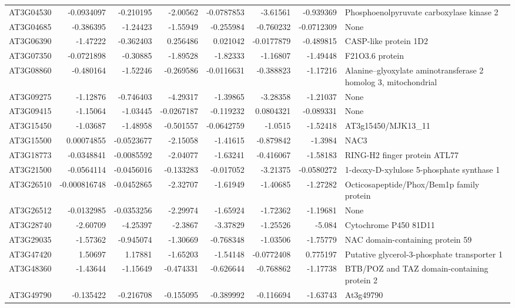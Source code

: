 \documentclass[11pt]{article}
\begin{document}
\begin{center}
\begin{tabular}{lrrrrrrl}
AT3G04530 & -0.0934097 & -0.210195 & -2.00562 & -0.0787853 & -3.61561 & -0.939369 & Phosphoenolpyruvate carboxylase kinase 2\\
AT3G04685 & -0.386395 & -1.24423 & -1.55949 & -0.255984 & -0.760232 & -0.0712309 & None\\
AT3G06390 & -1.47222 & -0.362403 & 0.256486 & 0.021042 & -0.0177879 & -0.489815 & CASP-like protein 1D2\\
AT3G07350 & -0.0721898 & -0.30885 & -1.89528 & -1.82333 & -1.16807 & -1.49448 & F21O3.6 protein\\
AT3G08860 & -0.480164 & -1.52246 & -0.269586 & -0.0116631 & -0.388823 & -1.17216 & Alanine--glyoxylate aminotransferase 2 homolog 3, mitochondrial\\
AT3G09275 & -1.12876 & -0.746403 & -4.29317 & -1.39865 & -3.28358 & -1.21037 & None\\
AT3G09415 & -1.15064 & -1.03445 & -0.0267187 & -0.119232 & 0.0804321 & -0.089331 & None\\
AT3G15450 & -1.03687 & -1.48958 & -0.501557 & -0.0642759 & -1.0515 & -1.52418 & AT3g15450/MJK13\_11\\
AT3G15500 & 0.00074855 & -0.0523677 & -2.15058 & -1.41615 & -0.879842 & -1.3984 & NAC3\\
AT3G18773 & -0.0348841 & -0.0085592 & -2.04077 & -1.63241 & -0.416067 & -1.58183 & RING-H2 finger protein ATL77\\
AT3G21500 & -0.0564114 & -0.0456016 & -0.133283 & -0.017052 & -3.21375 & -0.0580272 & 1-deoxy-D-xylulose 5-phosphate synthase 1\\
AT3G26510 & -0.000816748 & -0.0452865 & -2.32707 & -1.61949 & -1.40685 & -1.27282 & Octicosapeptide/Phox/Bem1p family protein\\
AT3G26512 & -0.0132985 & -0.0353256 & -2.29974 & -1.65924 & -1.72362 & -1.19681 & None\\
AT3G28740 & -2.60709 & -4.25397 & -2.3867 & -3.37829 & -1.25526 & -5.084 & Cytochrome P450 81D11\\
AT3G29035 & -1.57362 & -0.945074 & -1.30669 & -0.768348 & -1.03506 & -1.75779 & NAC domain-containing protein 59\\
AT3G47420 & 1.50697 & 1.17881 & -1.65203 & -1.54148 & -0.0772408 & 0.775197 & Putative glycerol-3-phosphate transporter 1\\
AT3G48360 & -1.43644 & -1.15649 & -0.474331 & -0.626644 & -0.768862 & -1.17738 & BTB/POZ and TAZ domain-containing protein 2\\
AT3G49790 & -0.135422 & -0.216708 & -0.155095 & -0.389992 & -0.116694 & -1.63743 & At3g49790\\

\end{tabular}
\end{center}
\end{document}
